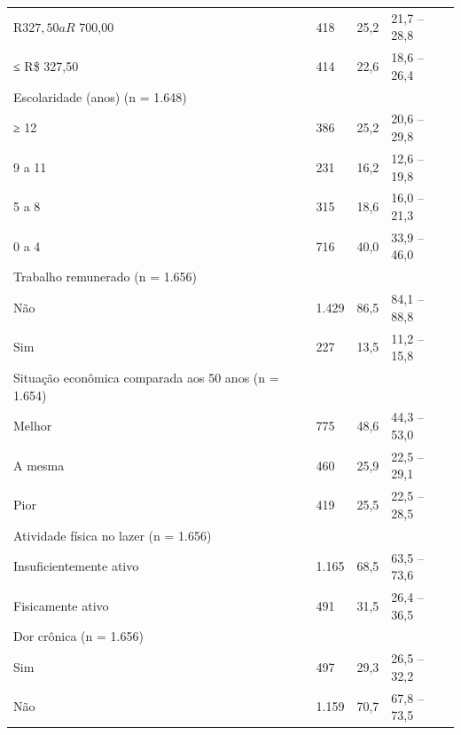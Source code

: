 \documentclass{article}
\begin{document}
\begin{table}
\begin{adjustbox}{center}
\begin{tabularx}{\textwidth}{>{\raggedright}b{4cm}  *{3}{J}}
R$ 327,50 a R$ 700,00                                & 418   & 25,2 & 21,7 – 28,8 \\
≤ R\$ 327,50                                         & 414   & 22,6 & 18,6 – 26,4 \\
Escolaridade (anos) (n = 1.648)                      &       &      &             \\
≥ 12                                                 & 386   & 25,2 & 20,6 – 29,8 \\
9 a 11                                               & 231   & 16,2 & 12,6 – 19,8 \\
5 a 8                                                & 315   & 18,6 & 16,0 – 21,3 \\
0 a 4                                                & 716   & 40,0 & 33,9 – 46,0 \\
Trabalho remunerado (n = 1.656)                      &       &      &             \\
Não                                                  & 1.429 & 86,5 & 84,1 – 88,8 \\
Sim                                                  & 227   & 13,5 & 11,2 – 15,8 \\
Situação econômica comparada aos 50 anos (n = 1.654) &       &      &             \\
Melhor                                               & 775   & 48,6 & 44,3 – 53,0 \\
A mesma                                              & 460   & 25,9 & 22,5 – 29,1 \\
Pior                                                 & 419   & 25,5 & 22,5 – 28,5 \\
Atividade física no lazer (n = 1.656)                &       &      &             \\
Insuficientemente ativo                              & 1.165 & 68,5 & 63,5 – 73,6 \\
Fisicamente ativo                                    & 491   & 31,5 & 26,4 – 36,5 \\
Dor crônica (n = 1.656)                              &       &      &             \\
Sim                                                  & 497   & 29,3 & 26,5 – 32,2 \\
Não                                                  & 1.159 & 70,7 & 67,8 – 73,5
\tabularnewline
\bottomrule
\end{tabularx}
\end{adjustbox}
\end{table}
\end{document}
